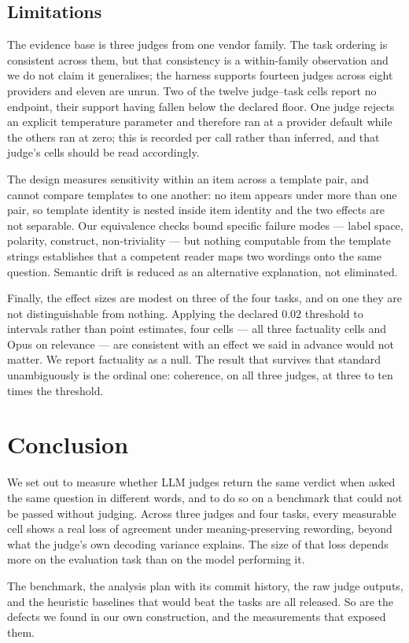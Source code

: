 \subsection{Limitations}

The evidence base is three judges from one vendor family. The task ordering is
consistent across them, but that consistency is a within-family observation and
we do not claim it generalises; the harness supports fourteen judges across eight
providers and eleven are unrun. Two of the twelve judge--task cells report no
endpoint, their support having fallen below the declared floor. One judge
rejects an explicit temperature parameter and therefore ran at a provider
default while the others ran at zero; this is recorded per call rather than
inferred, and that judge's cells should be read accordingly.

The design measures sensitivity within an item across a template pair, and cannot
compare templates to one another: no item appears under more than one pair, so
template identity is nested inside item identity and the two effects are not
separable. Our equivalence checks bound specific failure modes --- label space,
polarity, construct, non-triviality --- but nothing computable from the template
strings establishes that a competent reader maps two wordings onto the same
question. Semantic drift is reduced as an alternative explanation, not
eliminated.

Finally, the effect sizes are modest on three of the four tasks, and on one they
are not distinguishable from nothing. Applying the declared $0.02$ threshold to
intervals rather than point estimates, four cells --- all three factuality cells
and Opus on relevance --- are consistent with an effect we said in advance would
not matter. We report factuality as a null. The result that survives that
standard unambiguously is the ordinal one: coherence, on all three judges, at
three to ten times the threshold.

\section{Conclusion}

We set out to measure whether LLM judges return the same verdict when asked the
same question in different words, and to do so on a benchmark that could not be
passed without judging. Across three judges and four tasks, every measurable cell
shows a real loss of agreement under meaning-preserving rewording, beyond what
the judge's own decoding variance explains. The size of that loss depends more on
the evaluation task than on the model performing it.

The benchmark, the analysis plan with its commit history, the raw judge outputs,
and the heuristic baselines that would beat the tasks are all released. So are
the defects we found in our own construction, and the measurements that exposed
them.
